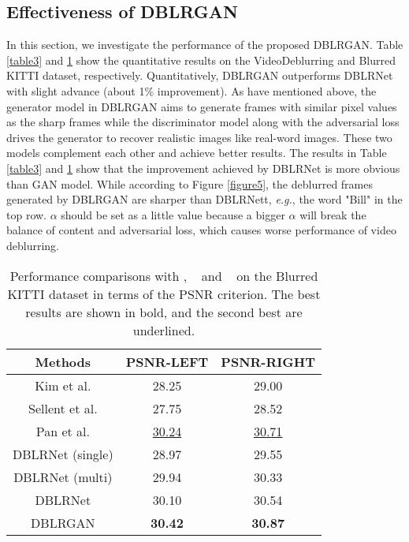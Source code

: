 \documentclass[journal]{IEEEtran}
\begin{document}
\subsection{Effectiveness of DBLRGAN}
In this section, we investigate the performance of the proposed DBLRGAN. Table \ref{table3} and \ref{table4} show the quantitative results on the VideoDeblurring and Blurred KITTI dataset, respectively. Quantitatively, DBLRGAN outperforms DBLRNet with slight advance (about 1\% improvement). As have mentioned above, the generator model in DBLRGAN aims to generate frames with similar pixel values as the sharp frames while the discriminator model along with the adversarial loss drives the generator to recover realistic images like real-word images. These two models complement each other and achieve better results. 
The results in Table \ref{table3} and \ref{table4} show that the improvement achieved by DBLRNet is more obvious than GAN model. While according to Figure \ref{figure5}, the deblurred frames generated by DBLRGAN are sharper than DBLRNett, \textit{e.g.}, the word "Bill" in the top row. $\alpha$ should be set as a little value because a bigger $\alpha$ will break the balance of content and adversarial loss, which causes worse performance of video deblurring.


\begin{table}
  \centering
    \caption{Performance comparisons with \cite{hyun2015generalized}, ~\cite{sellent2016stereo} and ~\cite{pan2017simultaneous} on the Blurred KITTI dataset in terms of the PSNR criterion. The best results are shown in bold, and the second best are underlined.}
    \begin{tabular}{c|cc}
    \toprule
    Methods & PSNR-LEFT & PSNR-RIGHT \\
    \hline
    Kim et al. & 28.25& 29.00\\
    Sellent et al. & 27.75& 28.52\\
    Pan et al. & \underline{30.24}& \underline{30.71}\\
    \hline
    DBLRNet (single) & 28.97 & 29.55\\
    DBLRNet (multi) & 29.94 & 30.33\\
    DBLRNet & 30.10 & 30.54 \\
    \hline
    DBLRGAN & \textbf{30.42} & \textbf{30.87} \\
    \bottomrule
    \end{tabular}
  \label{table4}
\end{table}
\end{document}

